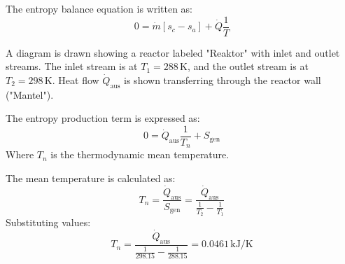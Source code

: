 The entropy balance equation is written as:  
\[
0 = \dot{m} \left[ s_c - s_a \right] + \dot{Q} \frac{1}{T}
\]  

A diagram is drawn showing a reactor labeled "Reaktor" with inlet and outlet streams. The inlet stream is at \( T_1 = 288 \, \text{K} \), and the outlet stream is at \( T_2 = 298 \, \text{K} \). Heat flow \( \dot{Q}_{\text{aus}} \) is shown transferring through the reactor wall ("Mantel").  

The entropy production term is expressed as:  
\[
0 = \dot{Q}_{\text{aus}} \frac{1}{T_n} + S_{\text{gen}}
\]  
Where \( T_n \) is the thermodynamic mean temperature.  

The mean temperature is calculated as:  
\[
T_n = \frac{\dot{Q}_{\text{aus}}}{S_{\text{gen}}} = \frac{\dot{Q}_{\text{aus}}}{\frac{1}{T_2} - \frac{1}{T_1}}
\]  
Substituting values:  
\[
T_n = \frac{\dot{Q}_{\text{aus}}}{\frac{1}{298.15} - \frac{1}{288.15}} = 0.0461 \, \text{kJ/K}
\]